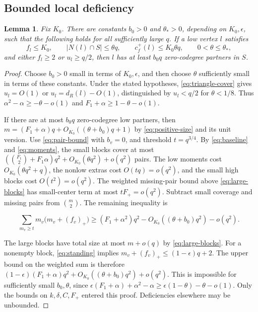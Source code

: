 \documentclass[11pt,reqno]{amsart}
\newtheorem{lemma}[theorem]{Lemma}
\theoremstyle{definition}
\theoremstyle{remark}
\numberwithin{equation}{section}
\begin{document}
\subsection{Bounded local deficiency}
\begin{lemma}\label{lem:bounded-local}
Fix \(K_0\). There are constants \(b_0>0\) and \(\theta_*>0\),
depending on \(K_0,\epsilon\), such that the following holds for all
sufficiently large \(q\). If a low vertex \(l\) satisfies
\[
f_l\le K_0,\qquad |N(l)\cap S|\le\theta q,\qquad
 c_f^+(l)\le K_0\theta q,\qquad 0<\theta\le\theta_*,
\]
and either \(f_l\ge2\) or \(u_l\ge q/2\), then \(l\) has at least
\(b_0q\) zero-codegree partners in \(S\).
\end{lemma}
\begin{proof}

Choose \(b_0>0\) small in terms of \(K_0,\epsilon\), and then choose \(\theta\) sufficiently small in terms of these constants. Under the stated hypotheses, \eqref{eq:triangle-cover} gives \(u_l=O(1)\) or \(u_l=d_R(l)-O(1)\), distinguished by \(u_l<q/2\) for \(\theta<1/8\). Thus \(\alpha^2-\alpha\ge-\theta-o(1)\) and \(F_1+\alpha\ge1-\theta-o(1)\).

If there are at most \(b_0q\) zero-codegree low partners, then \(m=(F_1+\alpha)q+O_{K_0}((\theta+b_0)q+1)\) by \eqref{eq:positive-size} and its unit version. Use \eqref{eq:pair-bound} with \(b_v=0\), and threshold \(t=q^{3/4}\). By \eqref{eq:baseline} and \eqref{eq:moments}, the small blocks cover at most \((\binom{F_1}2+F_1\alpha)q^2+O_{K_0}(\theta q^2)+o(q^2)\) pairs. The low moments cost \(O_{K_0}(\theta q^2+q)\), the nonlow extras cost \(O(tq)=o(q^2)\), and the small high blocks cost \(O(t^2)=o(q^2)\). The weighted missing-pair bound above \eqref{eq:large-blocks} has small-center term at most \(tF_+=o(q^2)\). Subtract small coverage and missing pairs from \(\binom m2\). The remaining inequality is

\[
\sum_{m_v\ge t}m_v\bigl(m_v+(f_v)_+\bigr)\ge
(F_1+\alpha^2)q^2-O_{K_0}((\theta+b_0)q^2)-o(q^2).
\]

The large blocks have total size at most \(m+o(q)\) by \eqref{eq:large-blocks}. For a nonempty block, \eqref{eq:standing} implies \(m_v+(f_v)_+\le(1-\epsilon)q+2\). The upper bound on the weighted sum is therefore \((1-\epsilon)(F_1+\alpha)q^2+O_{K_0}((\theta+b_0)q^2)+o(q^2)\). This is impossible for sufficiently small \(b_0,\theta\), since \(\epsilon(F_1+\alpha)+\alpha^2-\alpha\ge\epsilon(1-\theta)-\theta-o(1)\). Only the bounds on \(k,\delta,C,F_+\) entered this proof. Deficiencies elsewhere may be unbounded.
\end{proof}
\end{document}

